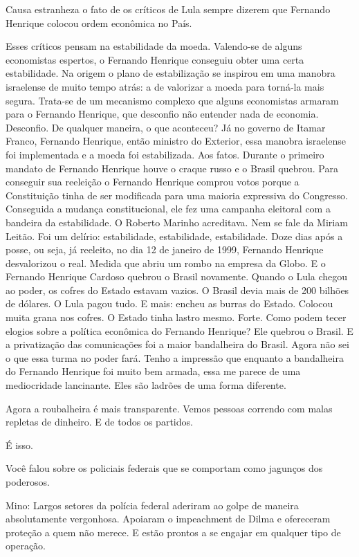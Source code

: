  Causa estranheza o fato de os críticos de Lula sempre dizerem que
Fernando Henrique colocou ordem econômica no País.

 Esses críticos pensam na estabilidade da moeda. Valendo-se de alguns
economistas espertos, o Fernando Henrique conseguiu obter uma certa
estabilidade. Na origem o plano de estabilização se inspirou em uma
manobra israelense de muito tempo atrás: a de valorizar a moeda para
torná-la mais segura. Trata-se de um mecanismo complexo que alguns
economistas armaram para o Fernando Henrique, que desconfio não entender
nada de economia. Desconfio. De qualquer maneira, o que aconteceu? Já no
governo de Itamar Franco, Fernando Henrique, então ministro do Exterior,
essa manobra israelense foi implementada e a moeda foi estabilizada. Aos
fatos. Durante o primeiro mandato de Fernando Henrique houve o craque
russo e o Brasil quebrou. Para conseguir sua reeleição o Fernando
Henrique comprou votos porque a Constituição tinha de ser modificada
para uma maioria expressiva do Congresso. Conseguida a mudança
constitucional, ele fez uma campanha eleitoral com a bandeira da
estabilidade. O Roberto Marinho acreditava. Nem se fale da Miriam
Leitão. Foi um delírio: estabilidade, estabilidade, estabilidade. Doze
dias após a posse, ou seja, já reeleito, no dia 12 de janeiro de 1999,
Fernando Henrique desvalorizou o real. Medida que abriu um rombo na
empresa da Globo. E o Fernando Henrique Cardoso quebrou o Brasil
novamente. Quando o Lula chegou ao poder, os cofres do Estado estavam
vazios. O Brasil devia mais de 200 bilhões de dólares. O Lula pagou
tudo. E mais: encheu as burras do Estado. Colocou muita grana nos
cofres. O Estado tinha lastro mesmo. Forte. Como podem tecer elogios
sobre a política econômica do Fernando Henrique? Ele quebrou o Brasil. E
a privatização das comunicações foi a maior bandalheira do Brasil. Agora
não sei o que essa turma no poder fará. Tenho a impressão que enquanto a
bandalheira do Fernando Henrique foi muito bem armada, essa me parece de
uma mediocridade lancinante. Eles são ladrões de uma forma diferente.

 Agora a roubalheira é mais transparente. Vemos pessoas correndo com
malas repletas de dinheiro. E de todos os partidos.

 É isso.

 Você falou sobre os policiais federais que se comportam como jagunços
dos poderosos.

Mino: Largos setores da polícia federal aderiram ao golpe de maneira
absolutamente vergonhosa. Apoiaram o impeachment de Dilma e ofereceram
proteção a quem não merece. E estão prontos a se engajar em qualquer
tipo de operação.

